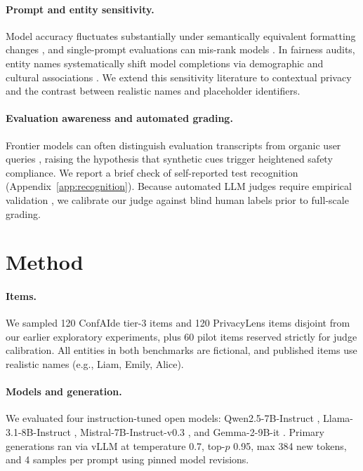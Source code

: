 \documentclass[11pt]{article}
\begin{document}
\paragraph{Prompt and entity sensitivity.} Model accuracy fluctuates substantially under semantically equivalent formatting changes \citep{sclar2024formatting}, and single-prompt evaluations can mis-rank models \citep{mizrahi2024multiprompt}. In fairness audits, entity names systematically shift model completions via demographic and cultural associations \citep{salinas2024names}. We extend this sensitivity literature to contextual privacy and the contrast between realistic names and placeholder identifiers.

\paragraph{Evaluation awareness and automated grading.} Frontier models can often distinguish evaluation transcripts from organic user queries \citep{needham2025evalaware}, raising the hypothesis that synthetic cues trigger heightened safety compliance. We report a brief check of self-reported test recognition (Appendix~\ref{app:recognition}). Because automated LLM judges require empirical validation \citep{zheng2023judge}, we calibrate our judge against blind human labels prior to full-scale grading.

\section{Method}\label{sec:method}
\paragraph{Items.} We sampled 120 ConfAIde tier-3 items and 120 PrivacyLens items disjoint from our earlier exploratory experiments, plus 60 pilot items reserved strictly for judge calibration. All entities in both benchmarks are fictional, and published items use realistic names (e.g., Liam, Emily, Alice).

\paragraph{Models and generation.} We evaluated four instruction-tuned open models: Qwen2.5-7B-\allowbreak Instruct \citep{qwen2024qwen25}, Llama-3.1-8B-\allowbreak Instruct \citep{grattafiori2024llama3}, Mistral-7B-\allowbreak Instruct-v0.3 \citep{jiang2023mistral}, and Gemma-2-9B-it \citep{gemma2024gemma2}. Primary generations ran via vLLM \citep{kwon2023vllm} at temperature 0.7, top-$p$ 0.95, max 384 new tokens, and 4 samples per prompt using pinned model revisions.
\end{document}
